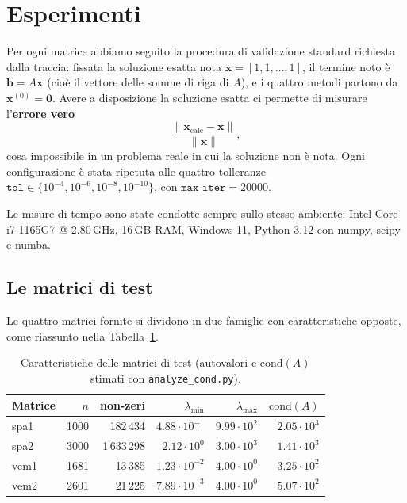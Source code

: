 \documentclass[11pt,a4paper]{article}
\begin{document}
\section{Esperimenti}
Per ogni matrice abbiamo seguito la procedura di validazione standard richiesta
dalla traccia: fissata la soluzione esatta nota $\mathbf{x}=[1,1,\dots,1]$, il
termine noto è $\mathbf{b}=A\mathbf{x}$ (cioè il vettore delle somme di riga di
$A$), e i quattro metodi partono da $\mathbf{x}^{(0)}=\mathbf{0}$. Avere a
disposizione la soluzione esatta ci permette di misurare l'\textbf{errore vero}
\[
  \frac{\lVert\mathbf{x}_{\text{calc}}-\mathbf{x}\rVert}{\lVert\mathbf{x}\rVert},
\]
cosa impossibile in un problema reale in cui la soluzione non è nota. Ogni
configurazione è stata ripetuta alle quattro tolleranze
$\texttt{tol}\in\{10^{-4},10^{-6},10^{-8},10^{-10}\}$, con
$\texttt{max\_iter}=20000$.

Le misure di tempo sono state condotte sempre sullo stesso ambiente: Intel Core
i7-1165G7 @ 2.80\,GHz, 16\,GB RAM, Windows 11, Python 3.12 con numpy, scipy e
numba.

\subsection{Le matrici di test}
Le quattro matrici fornite si dividono in due famiglie con caratteristiche
opposte, come riassunto nella Tabella~\ref{tab:matrici}.

\begin{table}[h]
\centering
\caption{Caratteristiche delle matrici di test (autovalori e $\mathrm{cond}(A)$
stimati con \texttt{analyze\_cond.py}).}
\label{tab:matrici}
\begin{tabular}{l r r r r r}
\toprule
Matrice & $n$ & non-zeri & $\lambda_{\min}$ & $\lambda_{\max}$ &
$\mathrm{cond}(A)$ \\
\midrule
spa1 & 1000 & 182\,434    & $4.88\cdot10^{-1}$ & $9.99\cdot10^{2}$ & $2.05\cdot10^{3}$ \\
spa2 & 3000 & 1\,633\,298 & $2.12\cdot10^{0}$  & $3.00\cdot10^{3}$ & $1.41\cdot10^{3}$ \\
vem1 & 1681 & 13\,385     & $1.23\cdot10^{-2}$ & $4.00\cdot10^{0}$ & $3.25\cdot10^{2}$ \\
vem2 & 2601 & 21\,225     & $7.89\cdot10^{-3}$ & $4.00\cdot10^{0}$ & $5.07\cdot10^{2}$ \\
\bottomrule
\end{tabular}
\end{table}
\end{document}
